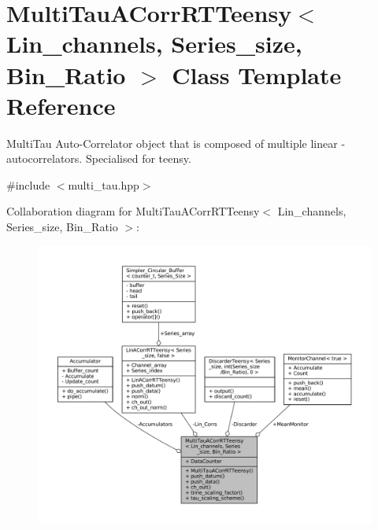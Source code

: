 \hypertarget{classMultiTauACorrRTTeensy}{}\section{Multi\+Tau\+A\+Corr\+R\+T\+Teensy$<$ Lin\+\_\+channels, Series\+\_\+size, Bin\+\_\+\+Ratio $>$ Class Template Reference}
\label{classMultiTauACorrRTTeensy}


Multi\+Tau Auto-\/\+Correlator object that is composed of multiple linear -\/ autocorrelators. Specialised for teensy.  




{\ttfamily \#include $<$multi\+\_\+tau.\+hpp$>$}



Collaboration diagram for Multi\+Tau\+A\+Corr\+R\+T\+Teensy$<$ Lin\+\_\+channels, Series\+\_\+size, Bin\+\_\+\+Ratio $>$\+:
\nopagebreak
\begin{figure}[H]
\begin{center}
\leavevmode
\includegraphics[width=350pt]{d8/d4e/classMultiTauACorrRTTeensy__coll__graph}
\end{center}
\end{figure}
